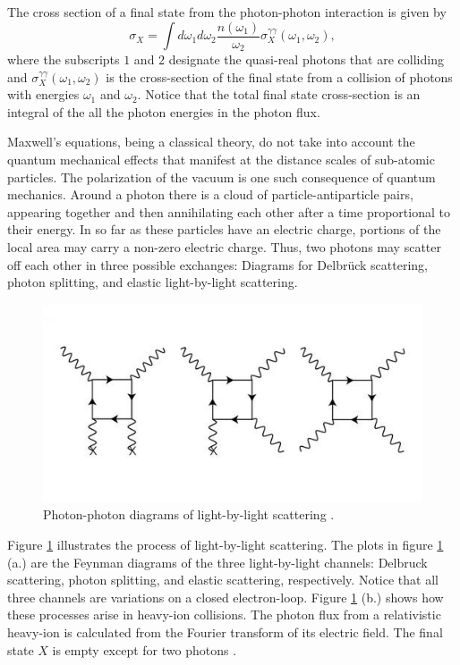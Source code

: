 The cross section of a final state from the photon-photon interaction is given by
\begin{equation}
\sigma_X = \int d \omega_1 d \omega_2 \frac{n(\omega_1)}{\omega_2} \sigma_X^{\gamma\gamma}(\omega_1, \omega_2),
\end{equation}
where the subscripts $1$ and $2$ designate the quasi-real photons that are colliding and 
$\sigma_X^{\gamma\gamma}(\omega_1, \omega_2)$ is the cross-section of the final state from a collision of photons with energies $\omega_1$ and $\omega_2$. Notice that the total final state cross-section is an integral of the all the photon energies in the photon flux. 

Maxwell's equations, being a classical theory, do not take into account the quantum mechanical effects that manifest at the distance scales of sub-atomic particles. The polarization of the vacuum is one such consequence of quantum mechanics. Around a photon there is a cloud of particle-antiparticle pairs, appearing together and then annihilating each other after a time proportional to their energy. In so far as these particles have an electric charge, portions of the local area may carry a non-zero electric charge. Thus, two photons may scatter off each other in three possible exchanges: Diagrams for Delbrück scattering, photon splitting, and elastic light-by-light scattering. 

\begin{figure}[]
\begin{centering}
\includegraphics[width=7in]{Chapter2/importfigs/nphys4208-f1.jpg}
\par\end{centering}
\caption{Photon-photon diagrams of light-by-light scattering \cite{Aaboud:2017bwk}. \label{fig:ggDiag}}
\end{figure}

Figure \ref{fig:ggDiag} illustrates the process of light-by-light scattering. The plots in figure \ref{fig:ggDiag} (a.) are the Feynman diagrams of the three light-by-light channels: Delbruck scattering, photon splitting, and elastic scattering, respectively. Notice that all three channels are variations on a closed electron-loop. Figure \ref{fig:ggDiag} (b.) shows how these processes arise in heavy-ion collisions. The photon flux from a relativistic heavy-ion is calculated from the Fourier transform of its electric field. The final state $X$ is empty except for two photons \cite{Aaboud:2017bwk}. 

